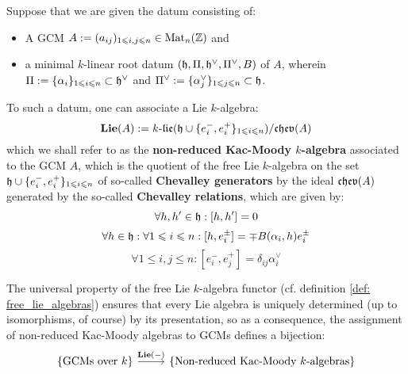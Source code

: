             \begin{definition} \label{def: non_reduced_kac_moody_algebras}
                Suppose that we are given the datum consisting of:
                    \begin{itemize}
                        \item A GCM $A := (a_{ij})_{1 \leqslant i, j \leqslant n} \in \mathrm{Mat}_n(\mathbb{Z})$ and
                        \item a minimal $k$-linear root datum $(\mathfrak{h}, \Pi, \mathfrak{h}^{\vee}, \Pi^{\vee}, B)$ of $A$, wherein $\Pi := \{\alpha_i\}_{1 \leqslant i \leqslant n} \subset \mathfrak{h}^{\vee}$ and $\Pi^{\vee} := \{\alpha_j^{\vee}\}_{1 \leqslant j \leqslant n} \subset \mathfrak{h}$. 
                    \end{itemize}
                To such a datum, one can associate a Lie $k$-algebra:
                    $$\mathbf{Lie}(A) := k\text{-}\mathfrak{lie}(\mathfrak{h} \cup \{e_i^-, e_i^+\}_{1 \leqslant i \leqslant n})/\mathfrak{chev}(A)$$
                which we shall refer to as the \textbf{non-reduced Kac-Moody $k$-algebra} associated to the GCM $A$, which is the quotient of the free Lie $k$-algebra on the set $\mathfrak{h} \cup \{e_i^-, e_i^+\}_{1 \leqslant i \leqslant n}$ of so-called \textbf{Chevalley generators} by the ideal $\mathfrak{chev}(A)$ generated by the so-called \textbf{Chevalley relations}, which are given by:
                    $$\forall h, h' \in \mathfrak{h}: [h, h'] = 0$$
                    $$\forall h \in \mathfrak{h}: \forall 1 \leqslant i \leqslant n: [h, e_i^{\pm}] = \mp B(\alpha_i, h) e_i^{\pm}$$
                    $$\forall 1 \leq i, j \leq n: [e_i^-, e_j^+] = \delta_{ij} \alpha_i^{\vee}$$
            \end{definition}
            \begin{remark} \label{remark: non_reduced_kac_moody_algebras_are_uniquely_determined_by_generalised_cartan_matrices}
                The universal property of the free Lie $k$-algebra functor (cf. definition \ref{def: free_lie_algebras}) ensures that every Lie algebra is uniquely determined (up to isomorphisms, of course) by its presentation, so as a consequence, the assignment of non-reduced Kac-Moody algebras to GCMs defines a bijection:
                    $$
                        \begin{tikzcd}
                        	{\left\{ \text{GCMs over $k$} \right\}} & {\left\{ \text{Non-reduced Kac-Moody $k$-algebras} \right\}}
                        	\arrow["{\bfLie(-)}", from=1-1, to=1-2]
                        \end{tikzcd}
                    $$
            \end{remark}
